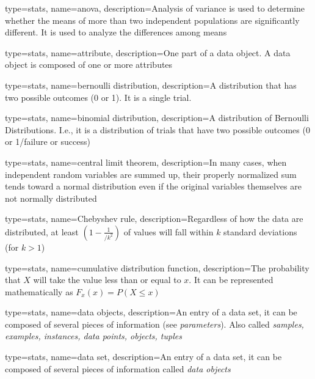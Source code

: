 

{
	type=stats,
	name=anova,
	description={Analysis of variance is used to determine whether the means of more than two independent populations are significantly different.  It is used to analyze the differences among means}
}

{
	type=stats,
	name=attribute,
	description={One part of a data object.  A data object is composed of one or more attributes}
}

{
	type=stats,
	name=bernoulli distribution,
	description={A distribution that has two possible outcomes (0 or 1).  It is a single trial.}
}

{
	type=stats,
	name=binomial distribution,
	description={A distribution of Bernoulli Distributions.  I.e., it is a distribution of trials that have two possible outcomes (0 or 1/failure or success)}
}

{
	type=stats,
	name=central limit theorem,
	description={In many cases, when independent random variables are summed up, their properly normalized sum tends toward a normal distribution even if the original variables themselves are not normally distributed}
}

{
	type=stats,
	name=Chebyshev rule,
	description={Regardless of how the data are distributed, at least $\left(1-\frac{1}{/k^2}\right)$ of values will fall within $k$ standard deviations (for $k>1$)}
}

{
	type=stats,
	name=cumulative distribution function,
	description={The probability that $X$ will take the value less than or equal to $x$.  It can be represented mathematically as $F_x\left(x\right)=P\left(X\leq{}x\right)$}
}

{
	type=stats,
	name=data objects,
	description={An entry of a data set, it can be composed of several pieces of information (see \textit{parameters}).  Also called \textit{samples, examples, instances, data points, objects, tuples}}
}

{
	type=stats,
	name=data set,
	description={An entry of a data set, it can be composed of several pieces of information called \textit{data objects}}
}


